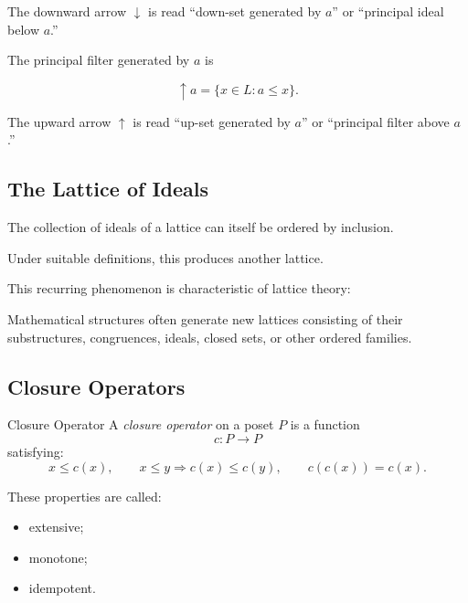 The downward arrow \(\downarrow\) is read ``down-set generated by \(a\)''
or ``principal ideal below \(a\).''

The principal filter generated by \(a\) is

\[ \uparrow a=\{x\in L:a\leq x\}. \]

The upward arrow \(\uparrow\) is read ``up-set generated by \(a\)'' or
``principal filter above \(a\).''

\subsection{The Lattice of Ideals}
\label{subsec:lattice-of-ideals}

The collection of ideals of a lattice can itself be ordered by inclusion.

Under suitable definitions, this produces another lattice.

This recurring phenomenon is characteristic of lattice theory:

\begin{conceptbox}
Mathematical structures often generate new lattices consisting of their
substructures, congruences, ideals, closed sets, or other ordered families.
\end{conceptbox}

\subsection{Closure Operators}
\label{subsec:lattice-closure-operators}

\begin{definitionbox}{Closure Operator}
A \emph{closure operator} on a poset \(P\) is a function
\[ c:P\to P \]
satisfying:
\[
x\leq c(x),
\qquad
x\leq y\Longrightarrow c(x)\leq c(y),
\qquad
c(c(x))=c(x).
\]
\end{definitionbox}

These properties are called:

\begin{itemize}
    \item extensive;
    \item monotone;
    \item idempotent.
\end{itemize}

